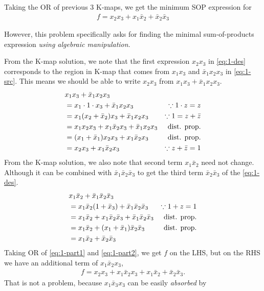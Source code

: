 \documentclass[twocolumn]{article}
\newcommand{\bx}{\bar{x}}
\newcommand{\bz}{\bar{z}}
\begin{document}
Taking the OR of previous 3 K-maps, we get the minimum SOP expression for
\begin{align}
f = x_2 x_3 + x_1 \bx_2 + \bx_2 \bx_3
  \label{eq:1-des}
\end{align}

However, this problem specifically asks for finding the minimal sum-of-products
expression \emph{using algebraic manipulation}.

From the K-map solution, we note
that the first expression $x_2x_3$ in \eqref{eq:1-des} corresponds to the region
in K-map that comes from $x_1x_3$ and $\bx_1 x_2 x_3$ in \eqref{eq:1-src}. This
means we should be able to write $x_2x_3$ from $x_1x_3 + \bx_1 x_2 x_3$.
%
\begin{align}
  &x_1x_3 + \bx_1 x_2 x_3 &
  \notag\\
  &=x_1\cdot 1 \cdot x_3 + \bx_1 x_2 x_3 & \because 1 \cdot z = z
  \notag\\
  &= x_1(x_2 + \bx_2)x_3 + \bx_1 x_2 x_3 & \because 1 = z + \bz
  \notag\\
  &= x_1x_2x_3 + x_1\bx_2x_3 + \bx_1 x_2 x_3 & \text{dist. prop.}
  \notag\\
  &= (x_1 + \bx_1)x_2x_3 + x_1\bx_2 x_3 & \text{dist. prop.}
  \notag\\
  &= x_2x_3 + x_1 \bx_2 x_3 & \because z+\bz = 1
    \label{eq:1-part1}
\end{align}
%
From the K-map solution, we also note that second term $x_1\bx_2$ need not
change. Although it can be combined with $\bx_1 \bx_2 \bx_3$ to get the third
term $\bx_2 \bx_3$ of the \eqref{eq:1-des}.
%
\begin{align}
  &x_1\bx_2 + \bx_1 \bx_2  \bx_3 &
  \notag\\
  &= x_1\bx_2 (1 + \bx_3) + \bx_1 \bx_2  \bx_3 & \because 1 + z = 1
  \notag\\
  &= x_1\bx_2 + x_1\bx_2\bx_3 + \bx_1 \bx_2 \bx_3 & \text{dist. prop.}
  \notag\\
  &= x_1\bx_2 + (x_1 + \bx_1) \bx_2 \bx_3 & \text{dist. prop.}
  \notag\\
  &= x_1\bx_2 + \bx_2 \bx_3
    \label{eq:1-part2}
\end{align}
%
Taking OR of \eqref{eq:1-part1} and \eqref{eq:1-part2}, we get $f$ on the LHS,
but on the RHS we have an additional term of $x_1 \bx_2 x_3$,
%
\begin{align}
  f = x_2 x_3 + x_1 \bx_2 x_3 + x_1 \bx_2 + \bx_2\bx_3.
  \label{eq:1-before-absorbed}
\end{align}
%
That is not a problem, because $x_1 \bx_3 x_3$ can be easily \emph{absorbed} by
\end{document}
